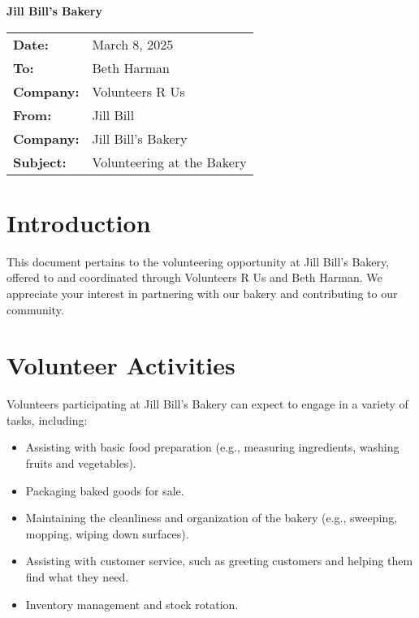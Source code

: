 \documentclass{article}
\begin{document}
\begin{center}
{\fontsize{24}{24}\textbf{Jill Bill's Bakery}}
\end{center}

\vspace{0.5in}

\begin{tabular}{ll}
\textbf{Date:} & March 8, 2025 \\
\textbf{To:} & Beth Harman \\
\textbf{Company:} & Volunteers R Us \\
\textbf{From:} & Jill Bill \\
\textbf{Company:} & Jill Bill's Bakery \\
\textbf{Subject:} & Volunteering at the Bakery \\
\end{tabular}

\vspace{0.5in}

\hrulefill

\vspace{0.5in}

\section*{Introduction}

This document pertains to the volunteering opportunity at Jill Bill's Bakery, offered to and coordinated through Volunteers R Us and Beth Harman. We appreciate your interest in partnering with our bakery and contributing to our community.

\vspace{0.25in}

\section*{Volunteer Activities}

Volunteers participating at Jill Bill's Bakery can expect to engage in a variety of tasks, including:

\begin{itemize}
    \item Assisting with basic food preparation (e.g., measuring ingredients, washing fruits and vegetables).
    \item Packaging baked goods for sale.
    \item Maintaining the cleanliness and organization of the bakery (e.g., sweeping, mopping, wiping down surfaces).
    \item Assisting with customer service, such as greeting customers and helping them find what they need.
    \item Inventory management and stock rotation.
\end{itemize}
\end{document}
